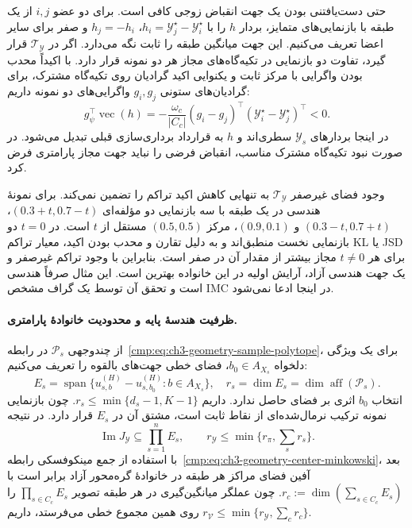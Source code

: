 حتی دست‌یافتنی بودن یک جهت انقباض زوجی کافی است. برای دو عضو $i,j$ از یک طبقه با بازنمایی‌های متمایز، بردار $h$ را با $h_i=\mathscr Y_j^\star-\mathscr Y_i^\star$، $h_j=-h_i$ و صفر برای سایر اعضا تعریف می‌کنیم. این جهت میانگین طبقه را ثابت نگه می‌دارد. اگر در $\mathcal T_{\mathscr Y}$ قرار گیرد، تفاوت دو بازنمایی در تکیه‌گاه‌های مجاز هر دو نمونه قرار دارد. با اکیداً محدب بودن واگرایی با مرکز ثابت و یکنوایی اکید گرادیان روی تکیه‌گاه مشترک، برای گرادیان‌های ستونی $g_i,g_j$ واگرایی‌های دو نمونه داریم:
\begin{equation}\label{cmp:eq:ch3-geometry-parametric-R-pair-contraction}
g_\psi^\top\operatorname{vec}(h)
=-\frac{\omega_c}{|C_c|}
(g_i-g_j)^\top(\mathscr Y_i^\star-\mathscr Y_j^\star)^\top<0.
\end{equation}
در اینجا بردارهای $\mathscr Y_s$ سطری‌اند و $h$ به قرارداد برداری‌سازی قبلی تبدیل می‌شود. در صورت نبود تکیه‌گاه مشترک مناسب، انقباض فرضی را نباید جهت مجاز پارامتری فرض کرد.

وجود فضای غیرصفر $\mathcal T_{\mathscr Y}$ به تنهایی کاهش اکید تراکم را تضمین نمی‌کند. برای نمونهٔ هندسی در یک طبقه با سه بازنمایی دو مؤلفه‌ای $(0.3+t,0.7-t)$، $(0.3-t,0.7+t)$ و $(0.9,0.1)$، مرکز $(0.5,0.5)$ مستقل از $t$ است. در $t=0$ دو بازنمایی نخست منطبق‌اند و به دلیل تقارن و محدب بودن اکید، معیار تراکم KL یا JSD برای هر $t\ne0$ مجاز بیشتر از مقدار آن در صفر است. بنابراین با وجود تراکم غیرصفر و یک جهت هندسی آزاد، آرایش اولیه در این خانواده بهترین است. این مثال صرفاً هندسی است و تحقق آن توسط یک گراف مشخص IMC در اینجا ادعا نمی‌شود.

\paragraph{ظرفیت هندسهٔ پایه و محدودیت خانوادهٔ پارامتری.}
از چندوجهی $\mathcal P_s$ در رابطه~\eqref{cmp:eq:ch3-geometry-sample-polytope}، برای یک ویژگی دلخواه $b_0\in A_{X_s}$، فضای خطی جهت‌های بالقوه را تعریف می‌کنیم:
\begin{equation}\label{cmp:eq:ch3-geometry-parametric-base-direction-space}
E_s=\operatorname{span}\{u_{s,b}^{(H)}-u_{s,b_0}^{(H)}:b\in A_{X_s}\},
\quad r_s=\dim E_s=\dim\operatorname{aff}(\mathcal P_s).
\end{equation}
انتخاب $b_0$ اثری بر فضای حاصل ندارد. داریم $r_s\le\min\{d_s-1,K-1\}$. چون بازنمایی نمونه ترکیب نرمال‌شده‌ای از نقاط ثابت است، مشتق آن در $E_s$ قرار دارد. در نتیجه
\begin{equation}\label{cmp:eq:ch3-geometry-parametric-base-rank-bound}
\operatorname{Im}J_{\mathscr Y}\subseteq\prod_{s=1}^n E_s,\qquad
r_{\mathscr Y}\le\min\{r_\pi,\sum_s r_s\}.
\end{equation}
با استفاده از جمع مینکوفسکی رابطه~\eqref{cmp:eq:ch3-geometry-center-minkowski}، بعد آفین فضای مراکز هر طبقه در خانوادهٔ گره‌محور آزاد برابر است با $r_c:=\dim(\sum_{s\in C_c}E_s)$. چون عملگر میانگین‌گیری در هر طبقه تصویر $\prod_{s\in C_c}E_s$ را روی همین مجموع خطی می‌فرستد، داریم $r_{\mathcal V}\le\min\{r_{\mathscr Y},\sum_c r_c\}$.

